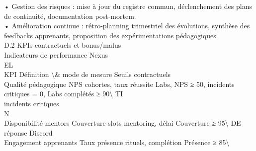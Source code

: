 \vspace{0.5em}
• Gestion des risques : mise à jour du registre commun, déclenchement des plans de continuité, documentation post-mortem.\\
\vspace{0.5em}
• Amélioration continue : rétro-planning trimestriel des évolutions, synthèse des feedbacks apprenants, proposition des expérimentations pédagogiques.\\
\vspace{0.5em}
\vspace{0.5em}
\vspace{0.5em}
D.2 KPIs contractuels et bonus/malus\\
Indicateurs de performance Nexus\\
\vspace{0.5em}
\vspace{0.5em}
\vspace{0.5em}
\vspace{0.5em}
EL\\
KPI                           Définition \textbackslash{}& mode de mesure            Seuils contractuels\\
Qualité pédagogique           NPS cohortes, taux réussite Labs,      NPS ≥ 50, incidents critiques = 0, Labs complétés ≥ 90\textbackslash{}%
\vspace{0.5em}
\vspace{0.5em}
\vspace{0.5em}
\vspace{0.5em}
TI\\
incidents critiques\\
\vspace{0.5em}
\vspace{0.5em}
\vspace{0.5em}
\vspace{0.5em}
N\\
Disponibilité mentors         Couverture slots mentoring, délai      Couverture ≥ 95\textbackslash{}%
\vspace{0.5em}
\vspace{0.5em}
\vspace{0.5em}
\vspace{0.5em}
DE\\
réponse Discord\\
Engagement apprenants         Taux présence rituels, complétion      Présence ≥ 85\textbackslash{}%
